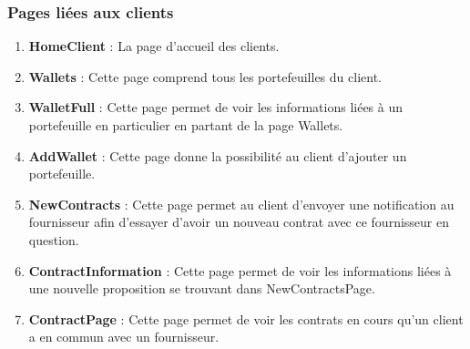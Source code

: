 \subsubsection{Pages liées aux clients}
\begin{enumerate}
\item \textbf{HomeClient} :\newline
La page d’accueil des clients.
\item \textbf{Wallets} :\newline
Cette page comprend tous les portefeuilles du client.
\item \textbf{WalletFull} :\newline
Cette page permet de voir les informations liées à un portefeuille en particulier en partant de la page Wallets.
\item \textbf{AddWallet} :\newline
Cette page donne la possibilité au client d’ajouter un portefeuille.
\item \textbf{NewContracts} : \newline
Cette page permet au client d’envoyer une notification au fournisseur afin d’essayer d’avoir un nouveau contrat avec ce fournisseur en question.
\item \textbf{ContractInformation} : \newline
Cette page permet de voir les informations liées à une nouvelle proposition se trouvant dans NewContractsPage.
\item \textbf{ContractPage} : \newline
Cette page permet de voir les contrats en cours qu’un client a en commun avec un fournisseur.
\end{enumerate} 

\newpage
